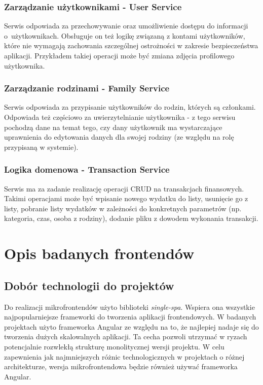 \documentclass{SGGW-thesis}
\begin{document}
    \subsection{Zarządzanie użytkownikami - User Service}
    Serwis odpowiada za przechowywanie oraz umożliwienie dostępu do informacji o~użytkownikach. Obsługuje on też logikę związaną z kontami użytkowników, które nie wymagają zachowania szczególnej ostrożności w zakresie bezpieczeństwa aplikacji. Przykładem takiej operacji może być zmiana zdjęcia profilowego użytkownika.

    \subsection{Zarządzanie rodzinami - Family Service}
    Serwis odpowiada za przypisanie użytkowników do rodzin, których są członkami. Odpowiada też częściowo za uwierzytelnianie użytkownika - z tego serwisu pochodzą dane na temat tego, czy dany użytkownik ma wystarczające uprawnienia do edytowania danych dla swojej rodziny (ze względu na rolę przypisaną w systemie).

    \subsection{Logika domenowa - Transaction Service}
    Serwis ma za zadanie realizację operacji CRUD na transakcjach finansowych. Takimi operacjami może być wpisanie nowego wydatku do listy, usunięcie go z listy, pobranie listy wydatków w zależności do konkretnych parametrów (np. kategoria, czas, osoba z rodziny), dodanie pliku z dowodem wykonania transakcji.

\chapter{Opis badanych frontendów}
  \section{Dobór technologii do projektów}
  Do realizacji mikrofrontendów użyto biblioteki \textit{single-spa}. Wspiera ona wszystkie najpopularniejsze frameworki do tworzenia aplikacji frontendowych. W badanych projektach użyto frameworka Angular ze względu na to, że najlepiej nadaje się do tworzenia dużych skalowalnych aplikacji. Ta cecha pozwoli utrzymać w ryzach potencjalnie rozwlekłą strukturę monolitycznej wersji projektu. W celu zapewnienia jak najmniejszych różnic technologicznych w projektach o różnej architekturze, wersja mikrofrontendowa będzie również używać frameworka Angular.
\end{document}
